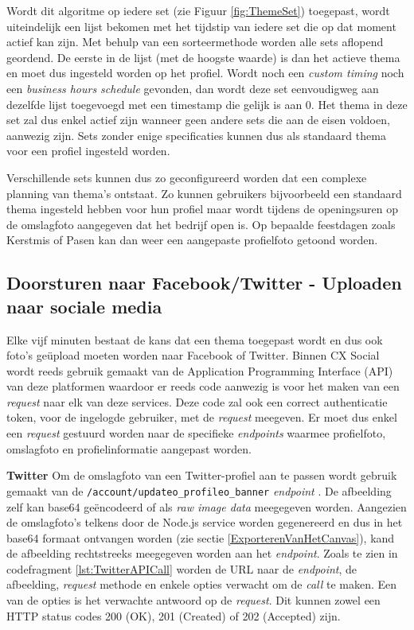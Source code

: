 Wordt dit algoritme op iedere set (zie Figuur \ref{fig:ThemeSet}) toegepast, wordt uiteindelijk een lijst bekomen met het tijdstip van iedere set die op dat moment actief kan zijn. Met behulp van een sorteermethode worden alle sets aflopend geordend. De eerste in de lijst (met de hoogste waarde) is dan het actieve thema en moet dus ingesteld worden op het profiel. Wordt noch een \textit{custom timing} noch een \textit{business hours schedule} gevonden, dan wordt deze set eenvoudigweg aan dezelfde lijst toegevoegd met een timestamp die gelijk is aan 0. Het thema in deze set zal dus enkel actief zijn wanneer geen andere sets die aan de eisen voldoen, aanwezig zijn. Sets zonder enige specificaties kunnen dus als standaard thema voor een profiel ingesteld worden. 

Verschillende sets kunnen dus zo geconfigureerd worden dat een complexe planning van thema's ontstaat. Zo kunnen gebruikers bijvoorbeeld een standaard thema ingesteld hebben voor hun profiel maar wordt tijdens de openingsuren op de omslagfoto aangegeven dat het bedrijf open is. Op bepaalde feestdagen zoals Kerstmis of Pasen kan dan weer een aangepaste profielfoto getoond worden. 

\subsection{Doorsturen naar Facebook/Twitter - Uploaden naar sociale media}
Elke vijf minuten bestaat de kans dat een thema toegepast wordt en dus ook foto's ge\"{u}pload moeten worden naar Facebook of Twitter. Binnen CX Social wordt reeds gebruik gemaakt van de Application Programming Interface (API) van deze platformen waardoor er reeds code aanwezig is voor het maken van een \textit{request} naar elk van deze services. Deze code zal ook een correct authenticatie token, voor de ingelogde gebruiker, met de \textit{request} meegeven. %
Er moet dus enkel een \textit{request} gestuurd worden naar de specifieke \textit{endpoints} waarmee profielfoto, omslagfoto en profielinformatie aangepast worden. 

\textbf{Twitter} \break
Om de omslagfoto van een Twitter-profiel aan te passen wordt gebruik gemaakt van de \texttt{/account/updateo{\_}profileo{\_}banner} \textit{endpoint} \cite{TwitterAPIDoc}. De afbeelding zelf kan base64 ge\"{e}ncodeerd of als \textit{raw image data} meegegeven worden. Aangezien de omslagfoto's telkens door de Node.js service worden gegenereerd en dus in het base64 formaat ontvangen worden (zie sectie \ref{ExporterenVanHetCanvas}), kand de afbeelding rechtstreeks meegegeven worden aan het \textit{endpoint}. Zoals te zien in codefragment \ref{lst:TwitterAPICall} worden de URL naar de \textit{endpoint}, de afbeelding, \textit{request} methode en enkele opties verwacht om de \textit{call} te maken. Een van de opties is het verwachte antwoord op de \textit{request}. Dit kunnen zowel een HTTP status codes 200 (OK), 201 (Created) of 202 (Accepted) zijn. 

